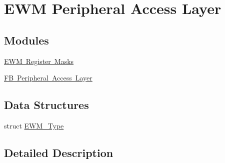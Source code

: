 \hypertarget{group___e_w_m___peripheral___access___layer}{}\section{E\+WM Peripheral Access Layer}
\label{group___e_w_m___peripheral___access___layer}
\subsection*{Modules}
\begin{DoxyCompactItemize}
\item 
\mbox{\hyperlink{group___e_w_m___register___masks}{E\+W\+M Register Masks}}
\item 
\mbox{\hyperlink{group___f_b___peripheral___access___layer}{F\+B Peripheral Access Layer}}
\end{DoxyCompactItemize}
\subsection*{Data Structures}
\begin{DoxyCompactItemize}
\item 
struct \mbox{\hyperlink{struct_e_w_m___type}{E\+W\+M\+\_\+\+Type}}
\end{DoxyCompactItemize}


\subsection{Detailed Description}
